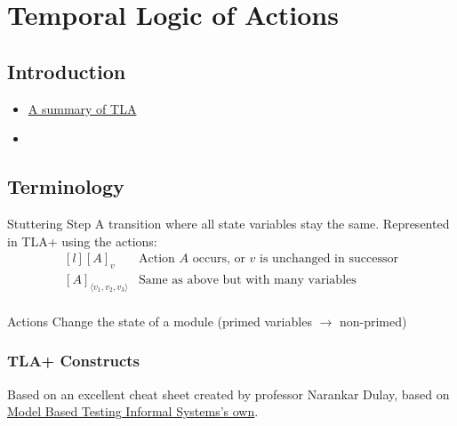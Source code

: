 \chapter{Temporal Logic of Actions}

\section{Introduction}



\begin{itemize}
    \item \href{https://lamport.azurewebsites.net/tla/summary-standalone.pdf}{A summary of TLA}
    \item 
\end{itemize}


\unfinished

\section{Terminology}
\begin{definitionbox}{Stuttering Step}
    A transition where all state variables stay the same. Represented in TLA+ using the actions:
    \[\begin{matrix*}[l]
        [A]_v & \text{Action }A \text{ occurs, or }v \text{ is unchanged in successor} \\
        [A]_{\langle v_1,v_2,v_3\rangle} & \text{Same as above but with many variables} \\
    \end{matrix*}\]
\end{definitionbox}
\begin{definitionbox}{Actions}
    Change the state of a module (primed variables $\to$ non-primed)
\end{definitionbox}
\subsection{TLA+ Constructs}
Based on an excellent cheat sheet created by professor Narankar Dulay, based on \href{https://mbt.informal.systems/docs/tla_basics_tutorials/tla+cheatsheet.html}{Model Based Testing \@ Informal Systems's own}.

\newcommand{\TLAset}[1]{\textcolor{blue}{\texttt{#1}}}
\newcommand{\TLAbool}[1]{\textcolor{red}{\texttt{#1}}}
\newcommand{\TLAinteger}[1]{\textcolor{yellow}{\texttt{#1}}}
\newcommand{\TLAfunction}[1]{\textcolor{green}{\texttt{#1}}}
\newcommand{\TLAtuple}[1]{\textcolor{purple}{\texttt{#1}}}
\newcommand{\TLAother}[1]{\textcolor{black}{\texttt{#1}}}

